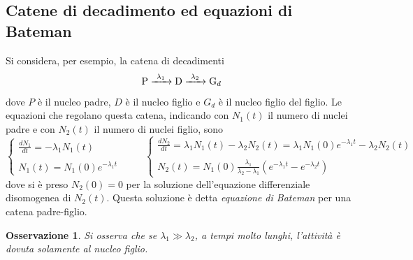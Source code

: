 \documentclass[11pt, a4paper]{scrartcl}
\theoremstyle{style}
\newtheorem{osservazione}{Osservazione}[section]
\theoremstyle{style1}
\numberwithin{equation}{subsection}
\begin{document}
\subsection{Catene di decadimento ed equazioni di Bateman}

Si considera, per esempio, la catena di decadimenti
\[
	\ce{P}\xrightarrow{\ \lambda _1\ } \ce{D} \xrightarrow{ \ \lambda _2 \ } \ce{G_d}
\] 
dove $P$ \`e il nucleo padre, $D$ \`e il nucleo figlio e $G_d$ \`e il nucleo figlio del figlio.
Le equazioni che regolano questa catena, indicando con $N_1(t)$ il numero di nuclei padre e con $N_2(t)$ il numero di nuclei figlio, sono
\[
\begin{cases}
	\displaystyle \frac{d N_1}{d t}  = - \lambda _1 N_1(t)\\
	\\
	N_1(t) = N_1(0) e^{-\lambda _1 t } 
\end{cases} \hspace{1cm} \begin{cases}
	\displaystyle \frac{d N_2}{d t}  = \lambda _1 N_1(t) - \lambda _2 N_2(t) = \lambda _1 N_1(0) e^{-\lambda _1 t} - \lambda _2 N_2(t) \\
	\\
	N_2(t) = N_1(0) \displaystyle \frac{\lambda _1 }{\lambda _2 - \lambda _1} \left(e^{-\lambda _1 t} - e^{-\lambda _2 t}\right) 
\end{cases}
\] 
dove si \`e preso $N_2(0) = 0$ per la soluzione dell'equazione differenziale disomogenea di $N_2(t)$.
Questa soluzione \`e detta \textit{equazione di Bateman} per una catena padre-figlio.	
\begin{osservazione}
Si osserva che se $\lambda _1 \gg \lambda _2$, a tempi molto lunghi, l'attivit\`a \`e dovuta solamente al nucleo figlio.
\end{osservazione}
\end{document}
